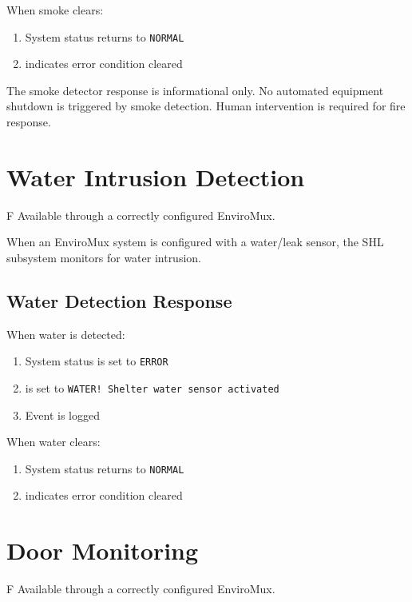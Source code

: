 When smoke clears:
\begin{enumerate}
    \item System status returns to \texttt{NORMAL}
    \item {} indicates error condition cleared
\end{enumerate}

\begin{noteBox}
The smoke detector response is informational only. No automated equipment shutdown is triggered by smoke detection. Human intervention is required for fire response.
\end{noteBox}

\section{Water Intrusion Detection}

\begin{newInVersion}{F}
Available through a correctly configured EnviroMux.
\end{newInVersion}

When an EnviroMux system is configured with a water/leak sensor, the SHL subsystem monitors for water intrusion.

\subsection{Water Detection Response}

When water is detected:
\begin{enumerate}
    \item System status is set to \texttt{ERROR}
    \item {} is set to \texttt{WATER! Shelter water sensor activated}
    \item Event is logged
\end{enumerate}

When water clears:
\begin{enumerate}
    \item System status returns to \texttt{NORMAL}
    \item {} indicates error condition cleared
\end{enumerate}

\section{Door Monitoring}

\begin{newInVersion}{F}
Available through a correctly configured EnviroMux.
\end{newInVersion}

